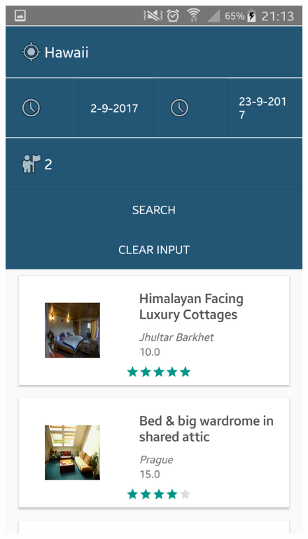 \documentclass[12pt]{article}
\begin{document}
	\begin{figure}
		\begin{center}
			\includegraphics[scale=0.15, keepaspectratio]{06-expandSearch.png}  

\end{center}
\end{figure}
\end{document}
